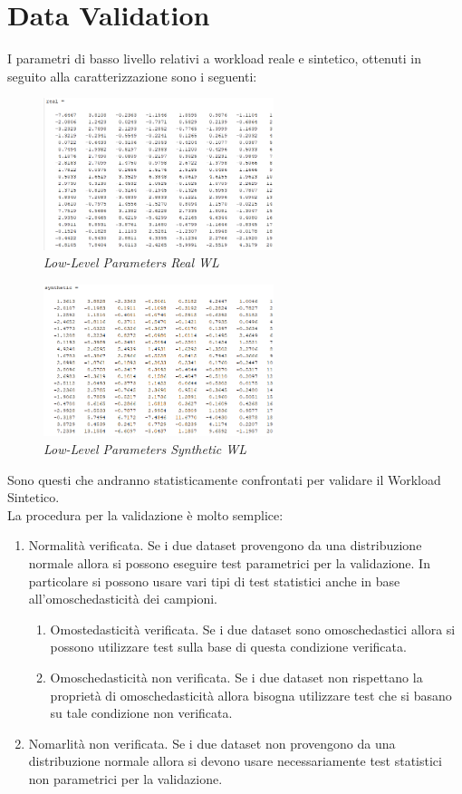 \section{Data Validation}
I parametri di basso livello relativi a workload reale e sintetico, ottenuti in seguito alla caratterizzazione sono i seguenti:
\begin{figure}[H]
	\centering
	\includegraphics[width=0.6\textwidth]{img/hw3/real_wl.png}
	\caption{\textit{Low-Level Parameters Real WL}}
\end{figure}
\begin{figure}[H]
	\centering
	\includegraphics[width=0.6\textwidth]{img/hw3/syn_wl.png}
	\caption{\textit{Low-Level Parameters Synthetic WL}}
\end{figure}
Sono questi che andranno statisticamente confrontati per validare il Workload Sintetico.
\\La procedura per la validazione è molto semplice:
\begin{enumerate}
	\item Normalità verificata. Se i due dataset provengono da una distribuzione normale allora si possono eseguire test parametrici per la validazione. In particolare si possono usare vari tipi di test statistici anche in base all'omoschedasticità dei campioni.
	\begin{enumerate}
		\item Omostedasticità verificata. Se i due dataset sono omoschedastici allora si possono utilizzare test sulla base di questa condizione verificata.
		\item Omoschedasticità non verificata. Se i due dataset non rispettano la proprietà di omoschedasticità allora bisogna utilizzare test che si basano su tale condizione non verificata.
	\end{enumerate}
	\item Nomarlità non verificata. Se i due dataset non provengono da una distribuzione normale allora si devono usare necessariamente test statistici non parametrici per la validazione.
\end{enumerate}

